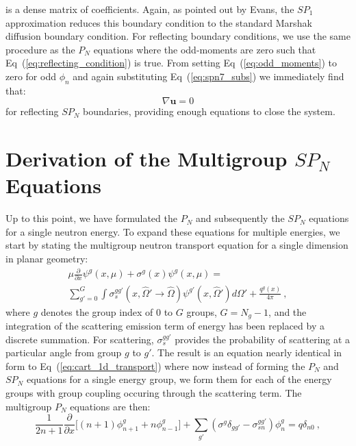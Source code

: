 is a dense matrix of coefficients. Again, as pointed out by Evans, the
$SP_1$ approximation reduces this boundary condition to the standard
Marshak diffusion boundary condition. For reflecting boundary
conditions, we use the same procedure as the $P_N$ equations where the
odd-moments are zero such that Eq~(\ref{eq:reflecting_condition}) is
true. From setting Eq~(\ref{eq:odd_moments}) to zero for odd $\phi_n$
and again substituting Eq~(\ref{eq:spn7_subs}) we immediately find
that:
\begin{equation}
  \nabla \mathbf{u} = 0
  \label{eq:spn_reflecting}
\end{equation}
for reflecting $SP_N$ boundaries, providing enough equations to close
the system.

\section{Derivation of the Multigroup $SP_N$ Equations}
\label{sec:mg_spn_equations}
Up to this point, we have formulated the $P_N$ and subsequently the
$SP_N$ equations for a single neutron energy. To expand these
equations for multiple energies, we start by stating the multigroup
neutron transport equation for a single dimension in planar geometry:
\begin{multline}
  \mu \frac{\partial}{\partial x} \psi^g(x,\mu) + \sigma^g(x)
  \psi^g(x,\mu) = \\ \sum_{g'=0}^{G} \int
  \sigma_s^{gg'}(x,\hat{\Omega}' \rightarrow \hat{\Omega})
  \psi^{g'}(x,\hat{\Omega}') d\Omega' + \frac{q^g(x)}{4 \pi}\:,
  \label{eq:cart_1d_multigroup}
\end{multline}
where $g$ denotes the group index of $0$ to $G$ groups, $G=N_g-1$, and
the integration of the scattering emission term of energy has been
replaced by a discrete summation. For scattering, $\sigma_s^{gg'}$
provides the probability of scattering at a particular angle from
group $g$ to $g'$. The result is an equation nearly identical in form
to Eq~(\ref{eq:cart_1d_transport}) where now instead of forming the
$P_N$ and $SP_N$ equations for a single energy group, we form them for
each of the energy groups with group coupling occuring through the
scattering term. The multigroup $P_N$ equations are then:
\begin{equation}
   \frac{1}{2n+1} \frac{\partial}{\partial x}\Big[ (n+1) \phi^g_{n+1}
     + n \phi^g_{n-1} \Big] +
   \sum_{g'}(\sigma^g\delta_{gg'}-\sigma^{gg'}_{sn}) \phi^g_n =
   q\delta_{n0} \:,
  \label{eq:multigroup_pn_equations}
\end{equation}
